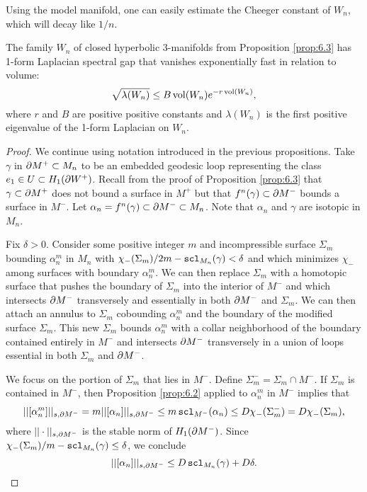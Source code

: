 \begin{remark}
Using the model manifold, one can easily estimate the Cheeger constant of $W_n$, which will decay like $1/n$.
\end{remark}


\begin{mainthm}  \label{thm:C} The family $W_n$ of closed hyperbolic 3-manifolds from Proposition \ref{prop:6.3}  has 1-form Laplacian spectral gap that vanishes exponentially fast in relation to volume:
$$\sqrt{\lambda(W_n)}\leq B\operatorname{vol}(W_n)e^{-r\operatorname{vol}(W_n)},$$
where $r$ and $B$ are positive positive constants and $\lambda(W_n)$ is the first positive eigenvalue of the 1-form Laplacian on $W_n$.
\end{mainthm}


\begin{proof}
We continue using notation introduced in the previous propositions. Take $\gamma$ in $\partial M^+\subset M_n$ to be an embedded geodesic loop representing the class $e_1 \in U \subset H_1(\partial W^+)$. Recall from the proof of Proposition \ref{prop:6.3} that $\gamma\subset \partial M^+$ does not bound a surface in $M^+$ but that $f^n(\gamma)\subset \partial M^-$ bounds a surface in $M^-$. Let $\alpha_n = f^n(\gamma)\subset \partial M^- \subset M_n$. Note that $\alpha_n$ and $\gamma$ are isotopic in $M_n$.

Fix $\delta>0$. Consider some positive integer $m$ and  incompressible surface $\Sigma_m$ bounding $\alpha_n^m$ in $M_n$ with $\chi_-(\Sigma_m)/2m - \operatorname{{\tt{scl}}}_{M_n}(\gamma) < \delta$ and which minimizes $\chi_-$ among surfaces with boundary $\alpha_n^m$. We can then replace $\Sigma_m$ with a homotopic surface that pushes the boundary of $\Sigma_m$ into the interior of $M^-$ and which intersects $\partial M^-$ transversely and essentially in both $\partial M^-$ and $\Sigma_m$.
We can then attach an annulus to $\Sigma_m$ cobounding $\alpha_n^m$ and the boundary of the modified surface $\Sigma_m$. This new $\Sigma_m$ bounds $\alpha_n^m$ with a collar neighborhood of the boundary contained entirely in $M^-$ and intersects $\partial M^-$ transversely in a union of loops essential in both $\Sigma_m$ and $\partial M^-$.

We focus on the portion of $\Sigma_m$ that lies in $M^-$. Define $\Sigma^-_m =\Sigma_m\cap M^-$. If $\Sigma_m$ is contained in $M^-$, then Proposition \ref{prop:6.2}  applied to $\alpha_n^m$ in $M^-$ implies that
$$||[\alpha_n^m]||_{s,\partial M^-} = m||[\alpha_n]||_{s,\partial M^-} \leq m\operatorname{{\tt{scl}}}_{M^-}(\alpha_n)\leq D\chi_-(\Sigma_m^-) = D\chi_-(\Sigma_m) ,$$
where $||\cdot||_{s, \partial M^-}$ is the stable norm of $H_1(\partial M^-)$. Since $\chi_-(\Sigma_m)/m- \operatorname{{\tt{scl}}}_{M_n}(\gamma)\leq \delta$, we conclude $$||[\alpha_n]||_{s,\partial M^-}\leq D\operatorname{{\tt{scl}}}_{M_n}(\gamma) + D\delta.$$


\end{proof}
